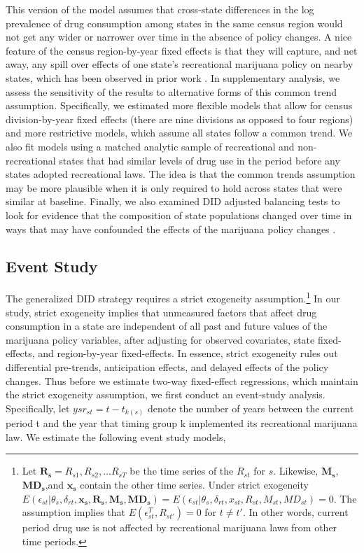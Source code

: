 \documentclass[12pt]{article}%
\begin{document}
This version of the model assumes that cross-state differences in the log prevalence of drug consumption among states in the same census region would not get any wider or narrower over time in the absence of policy changes. A nice feature of the census region-by-year fixed effects is that they will capture, and net away, any spill over effects of one state's recreational marijuana policy on nearby states, which has been observed in prior work \citep{HanenSpillovers2020}. In supplementary analysis, we assess the sensitivity of the results to alternative forms of this common trend assumption. Specifically, we estimated more flexible models that allow for census division-by-year fixed effects (there are nine divisions as opposed to four regions) and more restrictive models, which assume all states follow a common trend. We also fit models using a matched analytic sample of recreational and non-recreational states that had similar levels of drug use in the period before any states adopted recreational laws. The idea is that the common trends assumption may be more plausible when it is only required to hold across states that were similar at baseline. Finally, we also examined DID adjusted balancing tests to look for evidence that the composition of state populations changed over time in ways that may have confounded the effects of the marijuana policy changes \citep{Pei2019}.

\subsection{Event Study}\label{sec:research_design_event_study}

The generalized DID strategy requires a strict exogeneity assumption.\footnote{Let $\mathbf{R_s}=R_{s1},R_{s2},\ldots R_{sT}$ be the time series of the $R_{st}$ for $s$. Likewise, $\mathbf{M_s}$,$\mathbf{MD_s}$,and $\mathbf{x_s}$ contain the other time series. Under strict exogeneity $E(\epsilon_{st}| \theta_s,\delta_{rt},\mathbf{x_s},\mathbf{R_s},\mathbf{M_s},\mathbf{MD_s}) = E(\epsilon_{st}| \theta_s,\delta_{rt},x_{st},R_{st},M_{st},MD_{st})=0$. The assumption implies that $E(\epsilon_{st}^T, R_{st'})=0$ for $t\neq t'$. In other words, current period drug use is not affected by recreational marijuana laws from other time periods.} In our study, strict exogeneity implies that unmeasured factors that affect drug consumption in a state are independent of all past and future values of the marijuana policy variables, after adjusting for observed covariates, state fixed-effects, and region-by-year fixed-effects. In essence, strict exogeneity rules out differential pre-trends, anticipation effects, and delayed effects of the policy changes. Thus before we estimate two-way fixed-effect regressions, which maintain the strict exogeneity assumption, we first conduct an event-study analysis. Specifically, let $ysr_{st}=t-t_{k(s)}$  denote the number of years between the current period t and the year that timing group k implemented its recreational marijuana law.  We estimate the following event study models,
\end{document}
